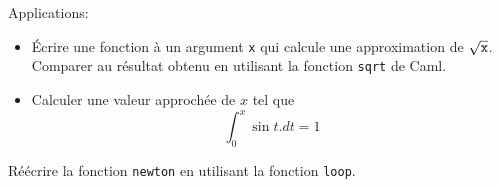 Applications:
\begin{itemize}
\item Écrire une fonction à un argument {\tt x} qui calcule une
      approximation de $\sqrt{\mbox{\tt x}}$.  Comparer au résultat
      obtenu en utilisant la fonction {\tt sqrt} de Caml.
\item Calculer une valeur approchée de $x$ tel que
      $$\int_0^x \sin t.dt = 1$$
\end{itemize}

\item Réécrire la fonction {\tt newton} en utilisant la fonction {\tt loop}.
